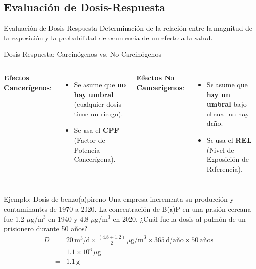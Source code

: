 \documentclass[10pt,compress]{beamer}
\begin{document}
\subsection{Evaluación de Dosis-Respuesta}
\begin{frame}{Evaluación de Dosis-Respuesta}
Determinación de la relación entre la magnitud de la exposición y la probabilidad de ocurrencia de un efecto a la salud.
\end{frame}
\begin{frame}{Dosis-Respuesta: Carcinógenos vs. No Carcinógenos}
    \begin{columns}
        \textbf{Efectos Cancerígenos}:
        \begin{itemize}
            \item Se asume que \textbf{no hay umbral} (cualquier dosis tiene un riesgo).
            \item Se usa el \textbf{CPF} (Factor de Potencia Cancerígena).
        \end{itemize}
        \textbf{Efectos No Cancerígenos}:
        \begin{itemize}
            \item Se asume que \textbf{hay un umbral} bajo el cual no hay daño.
            \item Se usa el \textbf{REL} (Nivel de Exposición de Referencia).
        \end{itemize}
    \end{columns}
\end{frame}
\begin{frame}{Ejemplo: Dosis de benzo(a)pireno}
Una empresa incrementa su producción y contaminantes de 1970 a 2020. La concentración de B(a)P en una prisión cercana fue 1.2 $\mu$g/m$^3$ en 1940 y 4.8 $\mu$g/m$^3$ en 2020. ¿Cuál fue la dosis al pulmón de un prisionero durante 50 años?
\begin{eqnarray*}
D &=& 20 \, \text{m}^3/\text{d} \times \frac{(4.8+1.2)}{2} \, \mu\text{g/m}^3 \times 365 \, \text{d/año} \times 50 \, \text{años}\\
& =& 1.1\times10^6 \, \mu\text{g} \\
&=& 1.1 \, \text{g}
\end{eqnarray*}
\end{frame}
\end{document}
